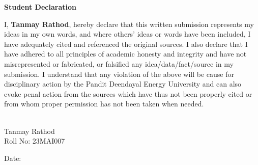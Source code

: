 \begin{center}
	\textbf{\large Student Declaration}
\end{center}

I, \textcolor{internationalkleinblue}{\textbf{Tanmay Rathod}}, hereby declare that this written submission represents my ideas in my own words, and  where others’ ideas or words have been included, I have adequately cited and referenced the original sources. I also declare that I have adhered to all principles of academic honesty and integrity and have not misrepresented or fabricated, or falsified any idea/data/fact/source in my submission. I understand that any violation of the above will be cause for disciplinary action by the Pandit Deendayal Energy University and can also evoke penal action from the sources which have thus not been properly cited or from whom proper permission has not been taken when needed.
\vspace{0.8cm}
\vspace{0.8cm}
\begin{flushright}
    \makebox[1.8in]{\hrulefill}\\
    Tanmay Rathod\\
    Roll No: 23MAI007\\
\end{flushright}
\vfill
\begin{flushleft}
	Date: \makebox[1.8in]{\hrulefill}
\end{flushleft} 